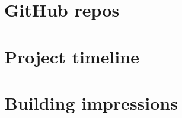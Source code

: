 \newpage
\appendix

\appendix
\begin{appendices}

\section{GitHub repos}

\section{Project timeline}

\section{Building impressions}

\end{appendices}